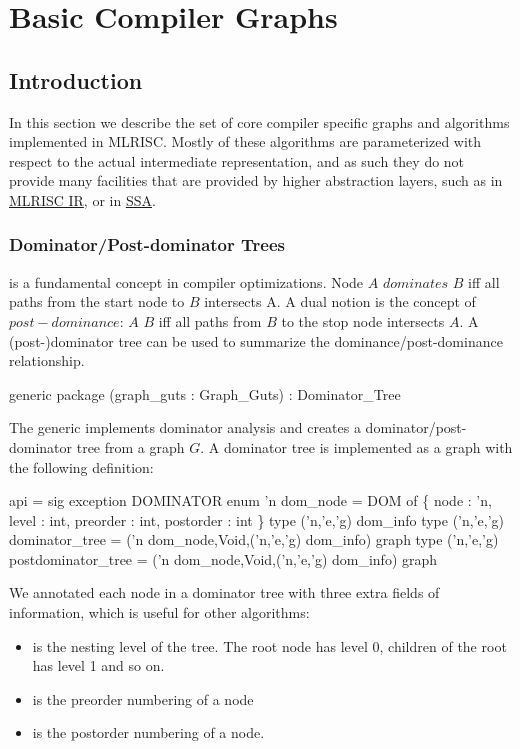\section{Basic Compiler Graphs}

\subsection{Introduction}
In this section we describe the set of core compiler specific graphs and
algorithms implemented in MLRISC.
Mostly of these algorithms are parameterized with respect
to the actual intermediate representation, and as such they
do not provide many facilities that are provided by higher abstraction
layers, such as in \href{mlrisc-ir.html}{MLRISC IR}, 
or in \href{SSA.html}{SSA}.

\subsubsection{Dominator/Post-dominator Trees}
is a fundamental concept in compiler optimizations.
Node $A$ $dominates$ $B$ 
iff all paths from the start node
to $B$ intersects A.  A dual notion is the concept of 
$post-dominance$:
$A$  $B$ iff all paths from $B$ to the stop node
intersects $A$.  A (post-)dominator tree can be used
to summarize the dominance/post-dominance relationship.

\begin{SML}
 generic package 
    (graph_guts : Graph_Guts) : Dominator_Tree
\end{SML}
   The generic implements dominator analysis and 
creates a dominator/post-dominator tree from a graph $G$.  A dominator tree is implemented as a graph
with the following definition:
\begin{SML}
 api  = sig
    exception DOMINATOR
    enum 'n dom_node =
       DOM of \{ node : 'n, level : int, preorder : int, postorder : int \}
    type ('n,'e,'g) dom_info
    type ('n,'e,'g) dominator_tree = ('n dom_node,Void,('n,'e,'g) dom_info) graph
    type ('n,'e,'g) postdominator_tree = ('n dom_node,Void,('n,'e,'g) dom_info) graph
\end{SML}

We annotated each node in
a dominator tree with three extra fields of information, which
is useful for other algorithms:
\begin{itemize}
  \item{} is the nesting level of the tree.  The root
  node has level 0, children of the root has level 1 and so on.
  \item{} is the preorder numbering of a node
  \item{} is the postorder numbering of a node.
\end{itemize}

